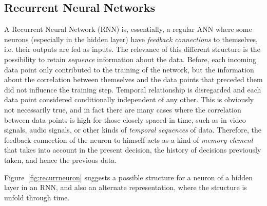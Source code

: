 \subsection{Recurrent Neural Networks}\label{sec:theorBack_rnn}
A Recurrent Neural Network (RNN) is, essentially, a regular ANN where some neurons (especially in the hidden layer) have \emph{feedback connections} to themselves, i.e. their outputs are fed as inputs. The relevance of this different structure is the possibility to retain \emph{sequence} information about the data. Before, each incoming data point only contributed to the training of the network, but the information about the correlation between themselves and the data points that preceded them did not influence the training step. Temporal relationship is disregarded and each data point considered conditionally independent of any other. This is obviously not necessarily true, and in fact there are many cases where the correlation between data points is high for those closely spaced in time, such as in video signals, audio signals, or other kinds of \emph{temporal sequences} of data. Therefore, the feedback connection of the neuron to himself acts as a kind of \emph{memory element} that takes into account in the present decision, the history of decisions previously taken, and hence the previous data. 

Figure~\ref{fig:recurrneuron} suggests a possible structure for a neuron of a hidden layer in an RNN, and also an alternate representation, where the structure is unfold through time.

